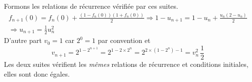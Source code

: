 \begin{enumerate}
\begin{displaymath}
\end{displaymath}
Formons les relations de récurrence vérifiée par ces suites.
\begin{multline*}
  f_{n+1}(0) = f_n(0) + \frac{(1-f_n(0))(1+f_n(0))}{2}\Rightarrow 1-u_{n+1}=1-u_n + \frac{u_n(2-u_n)}{2}\\
  \Rightarrow u_{n+1} = \frac{1}{2}u_n^2
\end{multline*}
D'autre part $v_0 = 1$ car $2^0=1$ par convention et 
\begin{displaymath}
 v_{n+1} = 2^{1-2^{n+1}} = 2^{1-2\times 2^{n}} = 2^{2\times(1-2^{n})-1} = v_n^2\,\frac{1}{2}
\end{displaymath}
Les deux suites vérifient les \emph{mêmes} relations de récurrence et conditions initiales, elles sont donc égales.
\end{enumerate}

